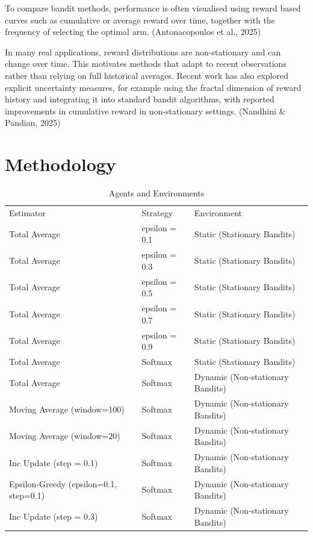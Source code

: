 \documentclass[11pt]{article}
\begin{document}
To compare bandit methods, performance is often visualised using reward based curves such as cumulative or average reward over time, together with the frequency of selecting the optimal arm. (Antonacopoulos et al., 2025)

In many real applications, reward distributions are non-stationary and can change over time. This motivates methods that adapt to recent observations rather than relying on full historical averages. Recent work has also explored explicit uncertainty measures, for example using the fractal dimension of reward history and integrating it into standard bandit algorithms, with reported improvements in cumulative reward in non-stationary settings. (Nandhini \& Pandian, 2025)

\section*{\LARGE Methodology}


\begin{table}[h]
\centering
\caption{Agents and Environments}
\label{table_1}
\begin{tabular}{lll}
\toprule
Estimator                                  & Strategy      & Environment                      \\
Total Average                              & epsilon = 0.1 & Static (Stationary Bandits)      \\
Total Average                              & epsilon = 0.3 & Static (Stationary Bandits)      \\
Total Average                              & epsilon = 0.5 & Static (Stationary Bandits)      \\
Total Average                              & epsilon = 0.7 & Static (Stationary Bandits)      \\
Total Average                              & epsilon = 0.9 & Static (Stationary Bandits)      \\
Total Average                              & Softmax       & Static (Stationary Bandits)      \\
Total Average                              & Softmax       & Dynamic (Non-stationary Bandits) \\
Moving Average (window=100)                & Softmax       & Dynamic (Non-stationary Bandits) \\
Moving Average (window=20)                 & Softmax       & Dynamic (Non-stationary Bandits) \\
Inc Update (step = 0.1)                    & Softmax       & Dynamic (Non-stationary Bandits) \\
Epsilon-Greedy (epsilon=0.1, step=0.1) & Softmax       & Dynamic (Non-stationary Bandits) \\
Inc Update (step = 0.3)                    & Softmax       & Dynamic (Non-stationary Bandits) \\
\bottomrule
\end{tabular}
\end{table}
\end{document}
